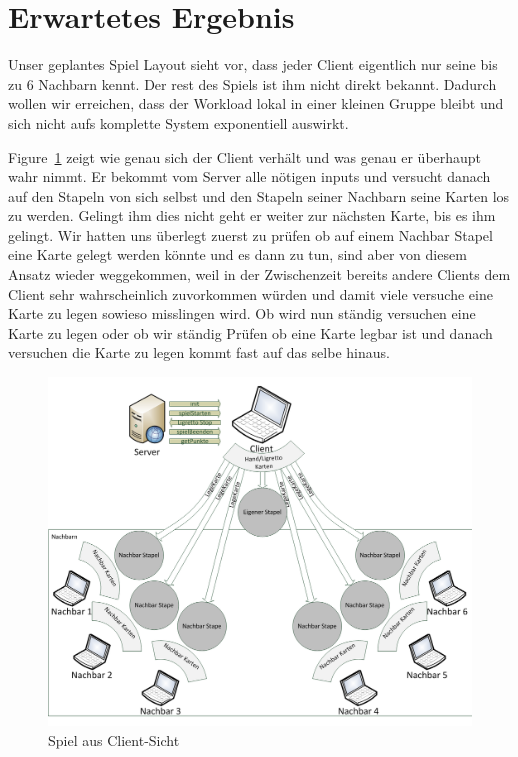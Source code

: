 \section{Erwartetes Ergebnis} 

Unser geplantes Spiel Layout sieht vor, dass jeder Client eigentlich nur seine bis zu 6 Nachbarn kennt. Der rest des Spiels ist ihm nicht direkt bekannt. Dadurch wollen wir erreichen, dass der Workload lokal in einer kleinen Gruppe bleibt und sich nicht aufs komplette System exponentiell auswirkt.

Figure~\ref{ergebnisspiellayout} zeigt wie genau sich der Client verhält und was genau er überhaupt wahr nimmt.
Er bekommt vom Server alle nötigen inputs und versucht danach auf den Stapeln von sich selbst und den Stapeln seiner Nachbarn seine Karten los zu werden. Gelingt ihm dies nicht geht er weiter zur nächsten Karte, bis es ihm gelingt. Wir hatten uns überlegt zuerst zu prüfen ob auf einem Nachbar Stapel eine Karte gelegt werden könnte und es dann zu tun, sind aber von diesem Ansatz wieder weggekommen, weil in der Zwischenzeit bereits andere Clients dem Client sehr wahrscheinlich zuvorkommen würden und damit viele versuche eine Karte zu legen sowieso misslingen wird. Ob wird nun ständig versuchen eine Karte zu legen oder ob wir ständig Prüfen ob eine Karte legbar ist und danach versuchen die Karte zu legen kommt fast auf das selbe hinaus.


\begin{figure}[hbt]
  \centering
  \includegraphics[width=19\textwidth,angle=0]{graphics/SpielLayout.png}
  \caption{Spiel aus Client-Sicht \hfill{} }
  \label{ergebnisspiellayout}
 \end{figure}

